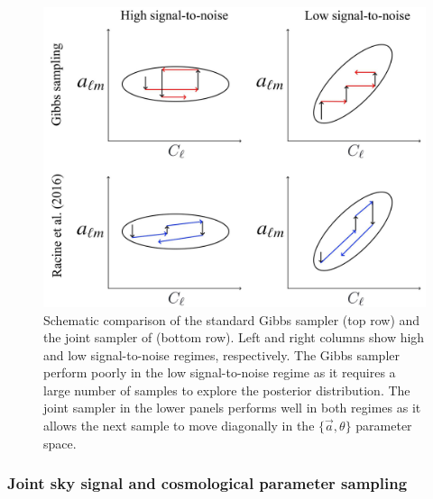 \documentclass[twocolumn]{../common/aa}
\renewcommand{\a}[0]{\vec{a}}
\begin{document}
\begin{figure}
	\centering
	\includegraphics[width=\linewidth]{figures/parameter_degeneracy.jpg}
	\caption{\label{fig:illustration}Schematic comparison of the standard Gibbs sampler (top row) and the joint sampler of \citet{racine:2016} (bottom row). Left and right columns show high and low signal-to-noise regimes, respectively. The Gibbs sampler perform poorly in the low signal-to-noise regime as it requires a large number of samples to explore the posterior distribution. The joint sampler in the lower panels performs well in both regimes as it allows the next sample to move diagonally in the $\{\a, \theta\}$ parameter space.}
\end{figure}

\subsubsection{Joint sky signal and cosmological parameter sampling}
\label{sec:joint-sampling}
\end{document}
